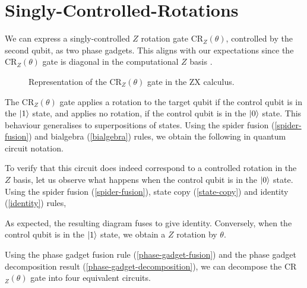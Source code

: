 \section{Singly-Controlled-Rotations}%
\label{singly-controlled-rotations}

We can express a singly-controlled $Z$ rotation gate CR$_Z(\theta)$, controlled by the second qubit, as two phase gadgets. This aligns with our expectations since the CR$_Z(\theta)$ gate is diagonal in the computational $Z$ basis \cite{Yeung2020}.

\begin{figure}[H]
    \centering
    \caption{Representation of the CR$_Z(\theta)$ gate in the ZX calculus.}
    \label{crz}
\end{figure}

The CR$_Z(\theta)$ gate applies a rotation to the target qubit if the control qubit is in the $\ket 1$ state, and applies no rotation, if the control qubit is in the $\ket 0$ state. This behaviour generalises to superpositions of states. Using the spider fusion (\ref{spider-fusion}) and bialgebra (\ref{bialgebra}) rules, we obtain the following in quantum circuit notation.


To verify that this circuit does indeed correspond to a controlled rotation in the $Z$ basis, let us observe what happens when the control qubit is in the $\ket 0$ state. Using the spider fusion (\ref{spider-fusion}), state copy (\ref{state-copy}) and identity (\ref{identity}) rules,


As expected, the resulting diagram fuses to give identity. Conversely, when the control qubit is in the $\ket 1$ state, we obtain a $Z$ rotation by $\theta$.


Using the phase gadget fusion rule (\ref{phase-gadget-fusion}) and the phase gadget decomposition result (\ref{phase-gadget-decomposition}), we can decompose the CR$_Z(\theta)$ gate into four equivalent circuits.

